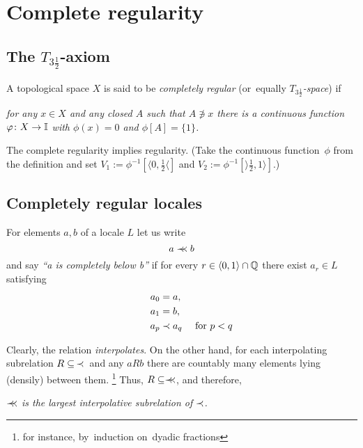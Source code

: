 \chapter{Complete regularity}

\section{The $T_{3\frac{1}{2}}$-axiom}

\begin{framed}
  \begin{df}[$T_{3\frac{1}{2}}$]
    A topological space $X$ is said to be \emph{completely regular\/}
    (or~equally \emph{$T_{3\frac{1}{2}}$-space\/}) if
    \begin{center} \it
      for any $x\in X$ and any closed $A$ such that $A\not\owns x$ there is a
      continuous function $\varphi\colon X \to \mathbb{I}$ with $\phi(x) = 0$ and $\phi[A]
      = \{1\}$.
    \end{center}
  \end{df}
\end{framed}

\begin{rem}
  The complete regularity implies regularity.
  (Take the continuous function~$\phi$ from the definition and set $V_1 :=
  \phi^{-1}[\langle 0, \frac{1}{2} \langle]$ and $V_2 := \phi^{-1}[\rangle
  \frac{1}{2}, 1 \rangle]$.)
\end{rem}

\section{Completely regular locales}

\begin{framed}
  \begin{nota}[$\cb$]
    For elements $a, b$ of a locale $L$ let us write
    \[
      a \prec\mkern-8mu\prec b
    \]
    and say \emph{``a is completely below b''\/} if for every $r\in \langle 0,
    1 \rangle \cap \mathbb{Q}$ there exist $a_r\in L$ satisfying
    \begin{align*}
      a_0 &= a, \\
      a_1 &= b, \\
      \qquad a_p &\prec a_q \quad \text{ for } p < q
    \end{align*}
  \end{nota}
\end{framed}

\begin{rem} \label{cb-largest-interpol}
  Clearly, the relation \emph{interpolates\/}.
  On the other hand, for each interpolating subrelation $R\subseteq \, \prec \, $
  and any $a R b$ there are countably many elements lying (densily) between
  them.%
  \footnote{for instance, by~induction on~dyadic fractions}
  Thus, $R\subseteq \prec\mkern-8mu\prec$, and therefore,
  \begin{center}
    \emph{$\cb$ is the largest interpolative subrelation of $\prec$.\/}
  \end{center}
\end{rem}

